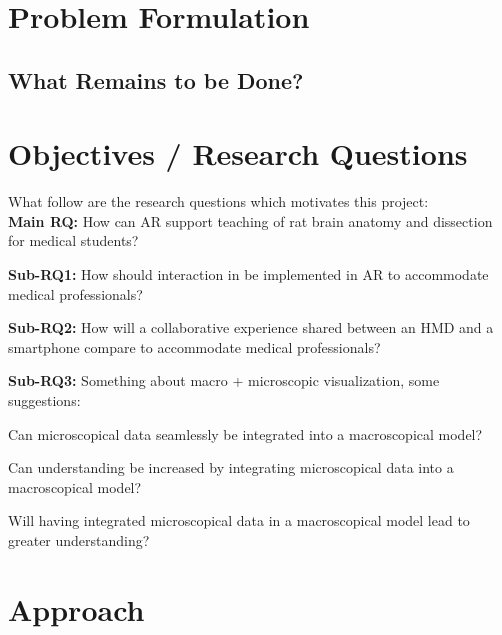 
\section{Problem Formulation}



\subsection*{What Remains to be Done?}

\section{Objectives / Research Questions}
What follow are the research questions which motivates this project: \\
\noindent
\textbf{Main RQ:} How can AR support teaching of rat brain anatomy and dissection for medical students?
\begin{itemize}
    \item {
        \textbf{Sub-RQ1:} How should interaction in be implemented in AR to accommodate medical professionals?
    }
    \item {
        \textbf{Sub-RQ2:} How will a collaborative experience shared between an HMD and a smartphone compare to accommodate medical professionals?
    }
    {
        \newline
        \color{BrickRed}
        \textbf{Sub-RQ3: }
        Something about macro + microscopic visualization, some suggestions:
        \item Can microscopical data seamlessly be integrated into a macroscopical model? 

        \item Can understanding be increased by integrating microscopical data into a macroscopical model?

        \item Will having integrated microscopical data in a macroscopical model lead to greater understanding?
    }
\end{itemize}


\section{Approach}


